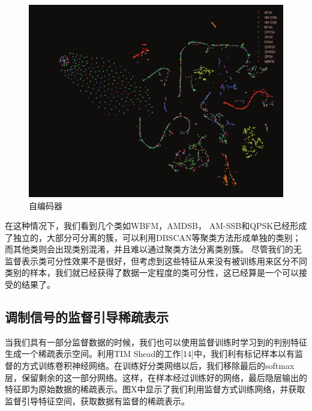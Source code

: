 \begin{figure}[!h]
	\centering
	\includegraphics[scale=0.2]{figures/chapter_3/cae_fea}
	\caption{自编码器}	\label{fig_3_5}
\end{figure}

在这种情况下，我们看到几个类如WBFM，AMDSB， AM-SSB和QPSK已经形成了独立的，大部分可分离的簇，可以利用DBSCAN等聚类方法形成单独的类别；而其他类则会出现类别混淆，并且难以通过聚类方法分离类别簇。 尽管我们的无监督表示类可分性效果不是很好，但考虑到这些特征从来没有被训练用来区分不同类别的样本，我们就已经获得了数据一定程度的类可分性，这已经算是一个可以接受的结果了。 \par 

\subsection{调制信号的监督引导稀疏表示}

当我们具有一部分监督数据的时候，我们也可以使用监督训练时学习到的判别特征生成一个稀疏表示空间。利用TIM Shead的工作[14]中，我们利有标记样本以有监督的方式训练卷积神经网络。在训练好分类网络以后，我们移除最后的softmax层，保留剩余的这一部分网络。这样，在样本经过训练好的网络，最后隐层输出的特征即为原始数据的稀疏表示。图X中显示了我们利用监督方式训练网络，并获取监督引导特征空间，获取数据有监督的稀疏表示。\par

